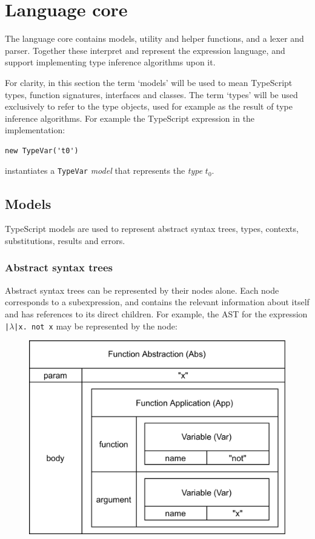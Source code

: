\documentclass[a4paper,fleqn,oneside,12pt]{report}
\begin{document}
\section{Language core}\label{id:h.o3ngfa303saw}

The language core contains models, utility and helper functions, and a lexer and parser. Together these interpret and represent the expression language, and support implementing type inference algorithms upon it.

For clarity, in this section the term `models' will be used to mean TypeScript types, function signatures, interfaces and classes. The term `types' will be used exclusively to refer to the type objects, used for example as the result of type inference algorithms. For example the TypeScript expression in the implementation:

\begin{verbatim}
new TypeVar('t0')
\end{verbatim}
instantiates a \texttt{TypeVar} \textit{model} that represents the \textit{type} $t_0$.

\subsection{Models}\label{id:h.f0aymht9bwx3}

TypeScript models are used to represent abstract syntax trees, types, contexts, substitutions, results and errors.

\subsubsection{Abstract syntax trees}\label{id:h.26q0jf334v10}

Abstract syntax trees can be represented by their nodes alone. Each node corresponds to a subexpression, and contains the relevant information about itself and has references to its direct children. For example, the AST for the expression \texttt{|$\lambda$|x. not x} may be represented by the node:

{\centering \begin{figure}[h!]
  \centering
  \includegraphics[width=\linewidth]{images/image19.png}
\end{figure} \par}
\end{document}
